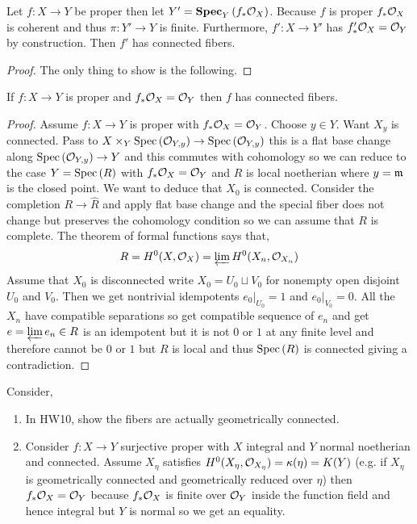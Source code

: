 \documentclass[12pt]{article}
\begin{document}
\begin{thm}[Stein]
Let $f : X \to Y$ be proper then let $Y' = \mathbf{Spec}_{Y}\left( f_* \mathcal{O}_{X} \right)$. Because $f$ is proper $f_* \mathcal{O}_{X}$ is coherent and thus $\pi : Y' \to Y$ is finite. Furthermore, $f' : X \to Y'$ has $f'_* \mathcal{O}_{X} = \mathcal{O}_{Y}$ by construction. Then $f'$ has connected fibers.
\end{thm}

\begin{proof}
The only thing to show is the following.
\end{proof}

\begin{thm}
If $f : X \to Y$ is proper and $f_* \mathcal{O}_{X} = \mathcal{O}_{Y}$ then $f$ has connected fibers.
\end{thm}

\begin{proof}
Assume $f : X \to Y$ is proper with $f_* \mathcal{O}_{X} = \mathcal{O}_{Y}$. Choose $y \in Y$. Want $X_y$ is connected. Pass to $X \times_Y \mathrm{Spec}\left( \mathcal{O}_{Y, y} \right) \to \mathrm{Spec}\left( \mathcal{O}_{Y, y} \right)$ this is a flat base change along $\mathrm{Spec}\left( \mathcal{O}_{Y, y} \right) \to Y$ and this commutes with cohomology so we can reduce to the case $Y = \mathrm{Spec}\left( R \right)$ with $f_* \mathcal{O}_{X} = \mathcal{O}_{Y}$ and $R$ is local noetherian where $y = \mathfrak{m}$ is the closed point. We want to deduce that $X_0$ is connected. Consider the completion $R \to \hat{R}$ and apply flat base change and the special fiber does not change but preserves the cohomology condition so we can assume that $R$ is complete. The theorem of formal functions says that,
\[ R = H^0(X, \mathcal{O}_{X}) = \varprojlim H^0(X_n, \mathcal{O}_{X_n}) \] 
Assume that $X_0$ is disconnected write $X_0 = U_0 \sqcup V_0$ for nonempty open disjoint $U_0$ and $V_0$. Then we get nontrivial idempotents $e_0 |_{U_0} = 1$ and $e_0|_{V_0} = 0$. All the $X_n$ have compatible separations so get compatible sequence of $e_n$ and get $e = \varprojlim e_n \in R$ is an idempotent but it is not $0$ or $1$ at any finite level and therefore cannot be $0$ or $1$ but $R$ is local and thus $\mathrm{Spec}\left( R \right)$ is connected giving a contradiction. 
\end{proof}

\begin{rmk}
Consider,
\begin{enumerate}
\item In HW10, show the fibers are actually geometrically connected.
\item Consider $f : X \to Y$ surjective proper with $X$ integral and $Y$ normal noetherian and connected. Assume $X_\eta$ satisfies $H^0(X_\eta, \mathcal{O}_{X_\eta}) = \kappa(\eta) = K(Y)$ (e.g. if $X_\eta$ is geometrically connected and geometrically reduced over $\eta$) then $f_* \mathcal{O}_{X} = \mathcal{O}_{Y}$ because $f_* \mathcal{O}_{X}$ is finite over $\mathcal{O}_{Y}$ inside the function field and hence integral but $Y$ is normal so we get an equality. 
\end{enumerate}
\end{rmk}
\end{document}
